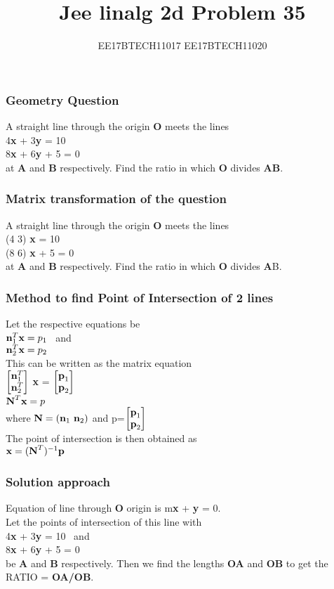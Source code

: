 \documentclass{beamer}
\title{Jee linalg 2d Problem 35}
\author{EE17BTECH11017  EE17BTECH11020}
\date{}
\begin{document}
\frame{\titlepage}

\begin{frame}
\frametitle{Geometry Question}
A straight line through the origin \textbf O meets the lines
\\4\textbf x + 3\textbf y = 10
\\8\textbf x + 6\textbf y + 5 = 0
\\at \textbf A and \textbf B respectively. Find the ratio in which \textbf O divides \textbf{AB}.
\end{frame}

\begin{frame}
\frametitle{Matrix transformation of the question}
A straight line through the origin \textbf O meets the lines
\\(4 3) \textbf x = 10
\\(8 6) \textbf x + 5 = 0
\\at \textbf A and \textbf B respectively. Find the ratio in which \textbf O divides \textbf AB.
\end{frame}

\begin{frame}
\frametitle{Method to find Point of Intersection of 2 lines}
Let the respective equations be \\
$\textbf n^T_1\textbf x = p_1$ \ and \\  
$\textbf n^T_2\textbf x = p_2$
\\This can be written as the matrix equation\\
$\begin{bmatrix}
\textbf n^T_1\\
\textbf n^T_2
\end{bmatrix}$
\textbf x = $\begin{bmatrix}
\textbf p_1\\\textbf p_2
\end{bmatrix}$
\\$\textbf N^T \textbf x = p$
\\where $\textbf N = (\textbf n_1 \ \textbf n_2)$ and p=$\begin{bmatrix}
\textbf p_1\\\textbf p_2
\end{bmatrix}$
\\The point of intersection is then obtained as
\\$\textbf x=(\textbf N^T)^{-1}\textbf p$
\end{frame}

\begin{frame}
\frametitle{Solution approach}
Equation of line through \textbf O origin is m\textbf x + \textbf y = 0.
\\Let the points of intersection of this line with \\4\textbf x + 3\textbf y = 10 \ and \\8\textbf x + 6\textbf y + 5 = 0 
\\be \textbf A and \textbf B respectively.
Then we find the lengths \textbf{OA} and \textbf{OB} to get the RATIO = \textbf{OA/OB}.
\end{frame}
\end{document}

